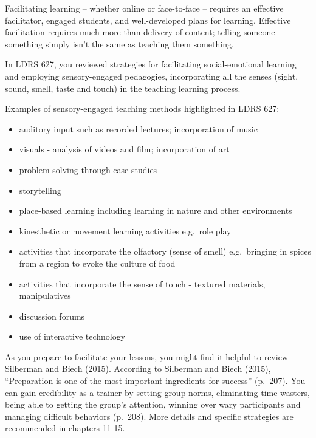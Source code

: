 \documentclass[
]{book}
\providecommand{\tightlist}{%
  \setlength{\itemsep}{0pt}\setlength{\parskip}{0pt}}
\begin{document}
Facilitating learning -- whether online or face-to-face -- requires an effective facilitator, engaged students, and well-developed plans for learning. Effective facilitation requires much more than delivery of content; telling someone something simply isn't the same as teaching them something.

In LDRS 627, you reviewed strategies for facilitating social-emotional learning and employing sensory-engaged pedagogies, incorporating all the senses (sight, sound, smell, taste and touch) in the teaching learning process.

Examples of sensory-engaged teaching methods highlighted in LDRS 627:

\begin{itemize}
\tightlist
\item
  auditory input such as recorded lectures; incorporation of music\\
\item
  visuals - analysis of videos and film; incorporation of art\\
\item
  problem-solving through case studies\\
\item
  storytelling\\
\item
  place-based learning including learning in nature and other environments\\
\item
  kinesthetic or movement learning activities e.g.~role play\\
\item
  activities that incorporate the olfactory (sense of smell) e.g.~bringing in spices from a region to evoke the culture of food\\
\item
  activities that incorporate the sense of touch - textured materials, manipulatives\\
\item
  discussion forums\\
\item
  use of interactive technology
\end{itemize}

As you prepare to facilitate your lessons, you might find it helpful to review Silberman and Biech (2015). According to Silberman and Biech (2015), ``Preparation is one of the most important ingredients for success'' (p.~207). You can gain credibility as a trainer by setting group norms, eliminating time wasters, being able to getting the group's attention, winning over wary participants and managing difficult behaviors (p.~208). More details and specific strategies are recommended in chapters 11-15.
\end{document}
